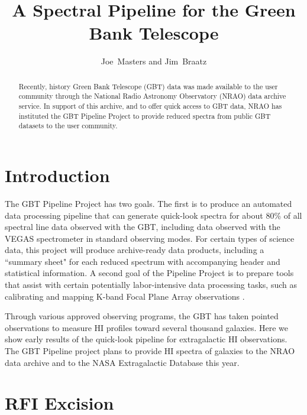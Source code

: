 
\resetcounters




\title{A Spectral Pipeline for the Green Bank Telescope}
\author{Joe~Masters and Jim~Braatz
}


\begin{abstract}
Recently, history Green Bank Telescope (GBT) data was made available to the user community through the National Radio Astronomy Observatory (NRAO) data archive service.  In support of this archive, and to offer quick access to GBT data, NRAO has instituted the GBT Pipeline Project to provide reduced spectra from public GBT datasets to the user community.
\end{abstract}

\section{Introduction}

The GBT Pipeline Project has two goals. The first is to produce an automated data processing pipeline that can generate quick-look spectra for about 80\% of all spectral line data observed with the GBT, including data observed with the VEGAS spectrometer \citep{2012arXiv1202.0938A} in standard observing modes. For certain types of science data, this project will produce archive-ready data products, including a ``summary sheet" for each reduced spectrum with accompanying header and statistical information. A second goal of the Pipeline Project is to prepare tools that assist with certain potentially labor-intensive data processing tasks, such as calibrating and mapping K-band Focal Plane Array observations \citep[see][]{2011ASPC..442..127M}.

Through various approved observing programs, the GBT has taken pointed observations to measure HI profiles toward several thousand galaxies. Here we show early results of the quick-look pipeline for extragalactic HI observations. The GBT Pipeline project plans to provide HI spectra of galaxies to the NRAO data archive and to the NASA Extragalactic Database this year.

\section{RFI Excision}

